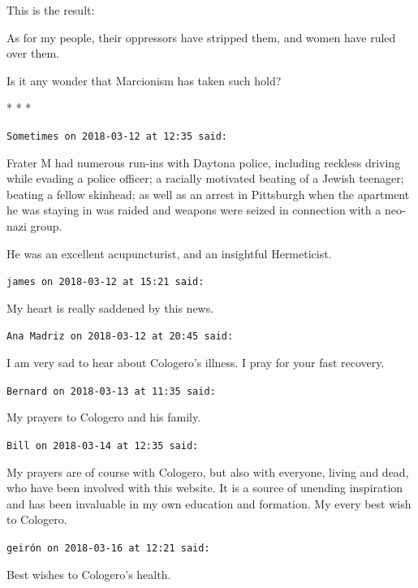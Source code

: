 This is the result:

\begin{quotex}
As for my people, their oppressors have stripped them, and women have ruled over them. 
\end{quotex}


Is it any wonder that Marcionism has taken such hold?



\begin{center}* * *\end{center}

\begin{footnotesize}
\begin{sffamily}
\texttt{Sometimes on 2018-03-12 at 12:35 said:}

Frater M had numerous run-ins with Daytona police, including reckless driving while evading a police officer; a racially motivated beating of a Jewish teenager; beating a fellow skinhead; as well as an arrest in Pittsburgh when the apartment he was staying in was raided and weapons were seized in connection with a neo-nazi group.

He was an excellent acupuncturist, and an insightful Hermeticist.

\hfill

\texttt{james on 2018-03-12 at 15:21 said:}

My heart is really saddened by this news.

\hfill

\texttt{Ana Madriz on 2018-03-12 at 20:45 said:}

I am very sad to hear about Cologero's illness. I pray for your fast recovery.

\hfill

\texttt{Bernard on 2018-03-13 at 11:35 said:}

My prayers to Cologero and his family.

\hfill

\texttt{Bill on 2018-03-14 at 12:35 said:}

My prayers are of course with Cologero, but also with everyone, living and dead, who have been involved with this website. It is a source of unending inspiration and has been invaluable in my own education and formation. My every best wish to Cologero.

\hfill

\texttt{geirón on 2018-03-16 at 12:21 said:}

Best wishes to Cologero's health.


\end{sffamily}
\end{footnotesize}
